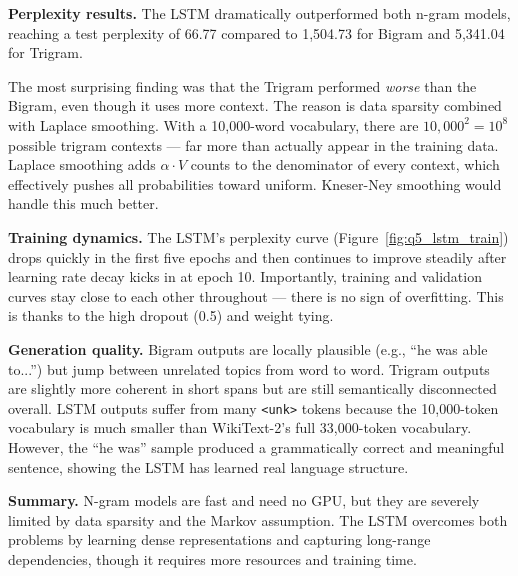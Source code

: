 \documentclass[12pt,a4paper]{article}
\begin{document}
\textbf{Perplexity results.}
The LSTM dramatically outperformed both n-gram models, reaching a test
perplexity of 66.77 compared to 1{,}504.73 for Bigram and 5{,}341.04 for Trigram.

The most surprising finding was that the Trigram performed \textit{worse} than
the Bigram, even though it uses more context. The reason is data sparsity
combined with Laplace smoothing. With a 10{,}000-word vocabulary, there are
$10{,}000^2 = 10^8$ possible trigram contexts — far more than actually appear in
the training data. Laplace smoothing adds $\alpha \cdot V$ counts to the
denominator of every context, which effectively pushes all probabilities toward
uniform. Kneser-Ney smoothing would handle this much better.

\textbf{Training dynamics.}
The LSTM's perplexity curve (Figure~\ref{fig:q5_lstm_train}) drops quickly in
the first five epochs and then continues to improve steadily after learning rate
decay kicks in at epoch 10. Importantly, training and validation curves stay
close to each other throughout — there is no sign of overfitting. This is thanks
to the high dropout (0.5) and weight tying.

\textbf{Generation quality.}
Bigram outputs are locally plausible (e.g., ``he was able to...'') but jump
between unrelated topics from word to word. Trigram outputs are slightly more
coherent in short spans but are still semantically disconnected overall. LSTM
outputs suffer from many \texttt{<unk>} tokens because the 10{,}000-token
vocabulary is much smaller than WikiText-2's full 33{,}000-token vocabulary.
However, the ``he was'' sample produced a grammatically correct and meaningful
sentence, showing the LSTM has learned real language structure.

\textbf{Summary.}
N-gram models are fast and need no GPU, but they are severely limited by data
sparsity and the Markov assumption. The LSTM overcomes both problems by learning
dense representations and capturing long-range dependencies, though it requires
more resources and training time.



\newpage


\end{document}
